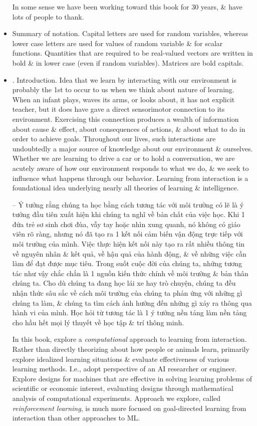 \documentclass{article}
\begin{document}
\begin{itemize}
    In some sense we have been working toward this book for 30 years, \& have lots of people to thank.
    \item {\sf Summary of notation.} Capital letters are used for random variables, whereas lower case letters are used for values of random variable \& for scalar functions. Quantities that are required to be real-valued vectors are written in bold \& in lower case (even if random variables). Matrices are bold capitals.
    \item {. Introduction.} Idea that we learn by interacting with our environment is probably the 1st to occur to us when we think about nature of learning. When an infant plays, waves its arms, or looks about, it has not explicit teacher, but it does have gave a direct sensorimotor connection to its environment. Exercising this connection produces a wealth of information about cause \& effect, about consequences of actions, \& about what to do in order to achieve goals. Throughout our lives, such interactions are undoubtedly a major source of knowledge about our environment \& ourselves. Whether we are learning to drive a car or to hold a conversation, we are acutely aware of how our environment responds to what we do, \& we seek to influence what happens through our behavior. Learning from interaction is a foundational idea underlying nearly all theories of learning \& intelligence.

    -- Ý tưởng rằng chúng ta học bằng cách tương tác với môi trường có lẽ là ý tưởng đầu tiên xuất hiện khi chúng ta nghĩ về bản chất của việc học. Khi 1 đứa trẻ sơ sinh chơi đùa, vẫy tay hoặc nhìn xung quanh, nó không có giáo viên rõ ràng, nhưng nó đã tạo ra 1 kết nối cảm biến vận động trực tiếp với môi trường của mình. Việc thực hiện kết nối này tạo ra rất nhiều thông tin về nguyên nhân \& kết quả, về hậu quả của hành động, \& về những việc cần làm để đạt được mục tiêu. Trong suốt cuộc đời của chúng ta, những tương tác như vậy chắc chắn là 1 nguồn kiến thức chính về môi trường \& bản thân chúng ta. Cho dù chúng ta đang học lái xe hay trò chuyện, chúng ta đều nhận thức sâu sắc về cách môi trường của chúng ta phản ứng với những gì chúng ta làm, \& chúng ta tìm cách ảnh hưởng đến những gì xảy ra thông qua hành vi của mình. Học hỏi từ tương tác là 1 ý tưởng nền tảng làm nền tảng cho hầu hết mọi lý thuyết về học tập \& trí thông minh.

    In this book, explore a {\it computational} approach to learning from interaction. Rather than directly theorizing about how people or animals learn, primarily explore idealized learning situations \& evaluate effectiveness of various learning methods. I.e., adopt perspective of an AI researcher or engineer. Explore designs for machines that are effective in solving learning problems of scientific or economic interest, evaluating designs through mathematical analysis of computational experiments. Approach we explore, called {\it reinforcement learning}, is much more focused on goal-directed learning from interaction than other approaches to ML.


\end{itemize}
\end{document}
